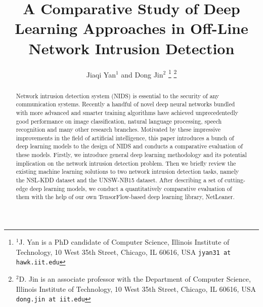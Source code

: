 \documentclass[letterpaper, 10 pt, conference]{ieeeconf}  %
\title{\LARGE \bf
A Comparative Study of Deep Learning Approaches in Off-Line Network Intrusion Detection
}
\author{Jiaqi Yan$^{1}$ and Dong Jin$^{2}$%
\thanks{$^{1}$J. Yan is a PhD candidate of Computer Science,
        Illinois Institute of Technology, 10 West 35th Street, Chicago, IL 60616, USA
        {\tt\small jyan31 at hawk.iit.edu}}%
\thanks{$^{2}$D. Jin is an associate professor with the Department of Computer Science,
		Illinois Institute of Technology,
        10 West 35th Street, Chicago, IL 60616, USA
        {\tt\small dong.jin at iit.edu}}%
}
\begin{document}
\maketitle
\thispagestyle{empty}
\pagestyle{empty}


\begin{abstract}
Network intrusion detection system (NIDS) is essential to the security of any communication systems.
Recently a handful of novel deep neural networks bundled with more advanced and smarter
training algorithms have achieved unprecedentedly good performance on image classification,
natural language processing, speech recognition and many other research branches.
Motivated by these impressive improvements in the field of artificial intelligence,
this paper introduces a bunch of deep learning models to the design of NIDS
and conducts a comparative evaluation of these models.
Firstly, we introduce general deep learning methodology and its potential implication on the
network intrusion detection problem.
Then we briefly review the existing machine learning solutions to two network intrusion detection tasks,
namely the NSL-KDD dataset and the UNSW-NB15 dataset.
After describing a set of cutting-edge deep learning models,
we conduct a quantitatively comparative evaluation of them with the help of
our own TensorFlow-based deep learning library, NetLeaner.
\end{abstract}












\end{document}
